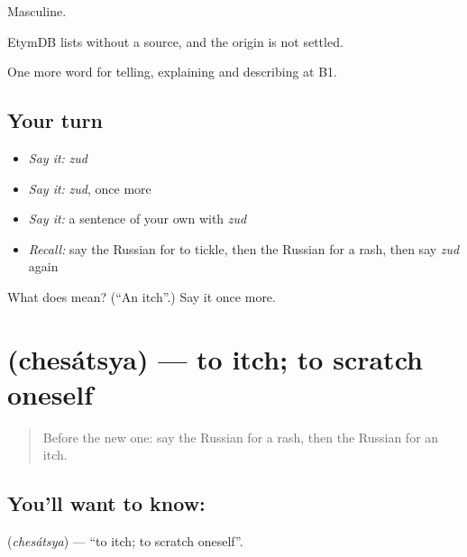 Masculine.

\begin{cousinweb}
EtymDB lists \emph{} without a source, and the origin is not settled.
\end{cousinweb}

\begin{grammarlens}[title={What you've built}]
One more word for telling, explaining and describing at B1.
\end{grammarlens}

\subsection*{Your turn}
\begin{itemize}
\raggedright
  \item \emph{Say it:} \emph{zud}
  \item \emph{Say it:} \emph{zud}, once more
  \item \emph{Say it:} a sentence of your own with \emph{zud}
  \item \emph{Recall:} say the Russian for to tickle, then the Russian for a rash, then say \emph{zud} again
\end{itemize}

\begin{tcolorbox}[breakable,colback=teal!4,colframe=teal!35!black,title={Before you move on}]
What does  mean? (\textquotedblleft{}An itch\textquotedblright{}.) Say it once more.
\end{tcolorbox}
\section[\texorpdfstring{\ru{чесаться} (chesátsya)}{чесаться (chesátsya)}]{ (chesátsya) — to itch; to scratch oneself}

\label{lesson:RU-C487-chesatsya}



\begin{quote}
Before the new one: say the Russian for a rash, then the Russian for an itch.
\end{quote}

\subsection*{You'll want to know: }
\textbf{} (\emph{chesátsya}) — \textquotedblleft{}to itch; to scratch oneself\textquotedblright{}.

